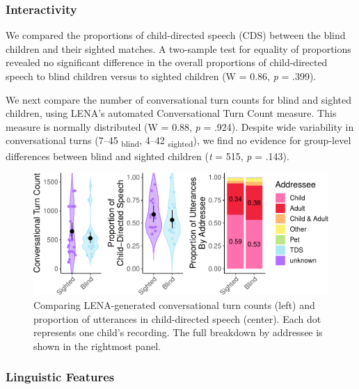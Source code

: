 \documentclass[
  man,floatsintext]{apa6}
\begin{document}
\hypertarget{interactivity-1}{%
\subsubsection{Interactivity}\label{interactivity-1}}

We compared the proportions of child-directed speech (CDS) between the blind children and their sighted matches. A two-sample test for equality of proportions revealed no significant difference in the overall proportions of child-directed speech to blind children versus to sighted children (W = 0.86, \emph{p} = .399).

We next compare the number of conversational turn counts for blind and sighted children, using LENA's automated Conversational Turn Count measure. This measure is normally distributed (W = 0.88, \emph{p} = .924). Despite wide variability in conversational turns (7--45 \textsubscript{blind}, 4--42 \textsubscript{sighted}), we find no evidence for group-level differences between blind and sighted children (\emph{t} = 515, \emph{p} = .143).

\begin{figure}
\centering
\includegraphics{input_quality_manuscript_files/figure-latex/interactivity-plots-1.pdf}
\caption{\label{fig:interactivity-plots}Comparing LENA-generated conversational turn counts (left) and proportion of utterances in child-directed speech (center). Each dot represents one child's recording. The full breakdown by addressee is shown in the rightmost panel.}
\end{figure}

\hypertarget{linguistic-features-1}{%
\subsubsection{Linguistic Features}\label{linguistic-features-1}}
\end{document}
